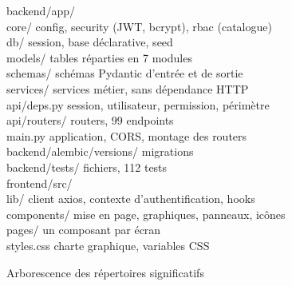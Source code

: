 \begin{figure}[H]
\centering
\begin{minipage}{0.92\textwidth}
\small\ttfamily\raggedright
\textcolor{medicaDeep}{backend/app/}\\
\hspace*{1em}core/ \hfill \textcolor{medicaMuted}{\rmfamily config, security (JWT, bcrypt), rbac (catalogue)}\\
\hspace*{1em}db/ \hfill \textcolor{medicaMuted}{\rmfamily session, base déclarative, seed}\\
\hspace*{1em}models/ \hfill \textcolor{medicaMuted}{ tables réparties en 7 modules}\\
\hspace*{1em}schemas/ \hfill \textcolor{medicaMuted}{\rmfamily schémas Pydantic d'entrée et de sortie}\\
\hspace*{1em}services/ \hfill \textcolor{medicaMuted}{ services métier, sans dépendance HTTP}\\
\hspace*{1em}api/deps.py \hfill \textcolor{medicaMuted}{\rmfamily session, utilisateur, permission, périmètre}\\
\hspace*{1em}api/routers/ \hfill \textcolor{medicaMuted}{ routers, 99 endpoints}\\
\hspace*{1em}main.py \hfill \textcolor{medicaMuted}{\rmfamily application, CORS, montage des routers}\\[4pt]
\textcolor{medicaDeep}{backend/alembic/versions/} \hfill \textcolor{medicaMuted}{ migrations}\\
\textcolor{medicaDeep}{backend/tests/} \hfill \textcolor{medicaMuted}{ fichiers, 112 tests}\\[6pt]
\textcolor{medicaDeep}{frontend/src/}\\
\hspace*{1em}lib/ \hfill \textcolor{medicaMuted}{\rmfamily client axios, contexte d'authentification, hooks}\\
\hspace*{1em}components/ \hfill \textcolor{medicaMuted}{\rmfamily mise en page, graphiques, panneaux, icônes}\\
\hspace*{1em}pages/ \hfill \textcolor{medicaMuted}{\rmfamily un composant par écran}\\
\hspace*{1em}styles.css \hfill \textcolor{medicaMuted}{\rmfamily charte graphique, variables CSS}
\end{minipage}
\caption{Arborescence des répertoires significatifs}
\label{fig:arborescence}
\end{figure}

